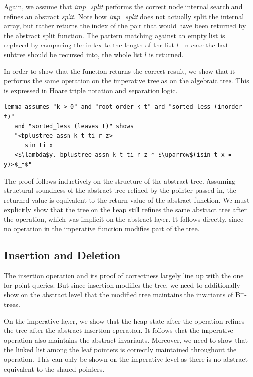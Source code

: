\documentclass[a4paper,UKenglish,cleveref, cref, thm-restate]{lipics-v2021}
\newcommand{\btrees}{B$^+$-trees}
\begin{document}
Again, we assume that \emph{imp\_split} performs the correct node internal search
and refines an abstract \emph{split}.
Note how \emph{imp\_split} does not actually split
the internal array, but rather returns the index of the pair
that would have been returned by the abstract split function.
The pattern matching against an empty list
is replaced by comparing the index to the length of the list $l$.
In case the last subtree should be recursed into, the whole list $l$ is returned.

In order to show that the function returns the correct result,
we show that it performs the same operation on the imperative tree
as on the algebraic tree.
This is expressed in Hoare triple notation and separation logic.

\begin{lstlisting}[mathescape=true, language=Isabelle,label=lst:isin-refines]
lemma assumes "k > 0" and "root_order k t" and "sorted_less (inorder t)"
   and "sorted_less (leaves t)" shows
   "<bplustree_assn k t ti r z>
     isin ti x
   <$\lambda$y. bplustree_assn k t ti r z * $\uparrow$(isin t x = y)>$_t$"
\end{lstlisting}

The proof follows inductively on the structure of the abstract tree.
Assuming structural soundness of the abstract tree refined by the pointer passed in,
the returned value is equivalent to the return value of the abstract function.
We must explicitly show that the tree on the heap
still refines the same abstract tree after the operation,
which was implicit on the abstract layer.
It follows directly, since no operation in the imperative
function modifies part of the tree.

\subsection{Insertion and Deletion}
\label{sec:insert_delete}

The insertion operation and its proof of correctness largely line up with the one for point queries.
But since insertion modifies the tree,
we need to additionally show on the abstract level that the modified tree
maintains the invariants of \btrees.

On the imperative layer, we show that the heap state
after the operation refines the tree
after the abstract insertion operation.
It follows that the imperative operation
also maintains the abstract invariants.
Moreover, we need to show that the linked list 
among the leaf pointers is correctly maintained throughout the operation.
This can only be shown on the imperative level as there is no abstract equivalent
to the shared pointers.
\end{document}
